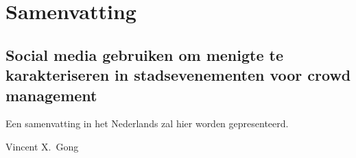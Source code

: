 \chapter*{Samenvatting}

\graphicspath{{./ch-x-others/images/}}


\section*{Social media gebruiken om menigte te karakteriseren in stadsevenementen voor crowd management}

Een samenvatting in het Nederlands zal hier worden gepresenteerd.


\bigskip
\noindent Vincent X.\ Gong

